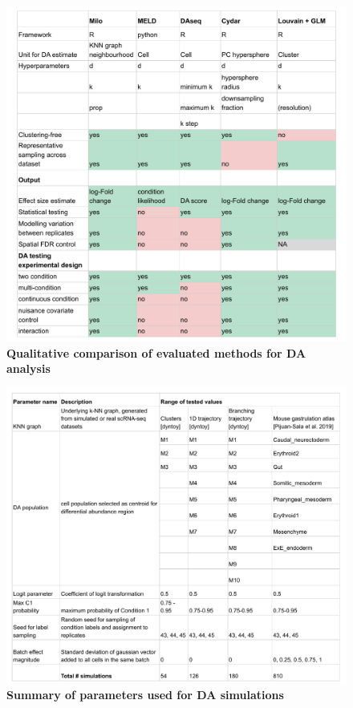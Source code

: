 \documentclass[
]{article}
\begin{document}
\renewcommand{\figurename}{Supplementary Table}
\setcounter{figure}{0}

\begin{figure}
\centering
\includegraphics{suppl_tables/table_methods_comparison.pdf}
\caption{\label{fig:sup-tab-1}\textbf{Qualitative comparison of evaluated methods for DA analysis}}
\end{figure}



\begin{figure}
\centering
\includegraphics{suppl_tables/table_simulation_params.pdf}
\caption{\label{fig:sup-tab-2}\textbf{Summary of parameters used for DA simulations}}
\end{figure}
\end{document}
